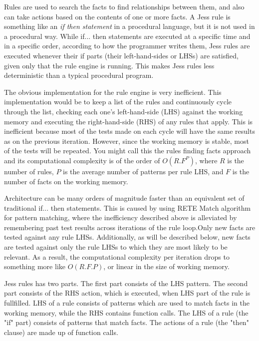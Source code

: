 \documentclass[conference]{IEEEtran}
\begin{document}
Rules are used to search the facts to find relationships
between them, and also can take actions based on the contents of one or more
facts. A Jess rule is something like an \textit{if then statement} in a
procedural language, but it is not used in a procedural way. While if... then statements are executed at a specific time and in a
specific order, according to how the programmer writes them, Jess rules are executed
whenever their if parts (their left-hand-sides or LHSs) are satisfied, given only that the rule
engine is running. This makes Jess rules less deterministic than a typical procedural program.


The obvious implementation for the rule engine is very inefficient. This
implementation would be to keep a list of the rules and continuously cycle
through the list, checking each one's left-hand-side (LHS) against the working
memory and executing the right-hand-side (RHS) of any rules that apply. This is
inefficient because most of the tests made on each cycle will have the same
results as on the previous iteration. However, since the working memory is
stable, most of the tests will be repeated. You might call this the rules
finding facts approach and its computational complexity is of the order of
$O(R.F^P)$, where $R$ is the number of rules, $P$ is the average number of
patterns per rule LHS, and $F$ is the number of facts on the working memory.



Architecture can be many orders of magnitude faster than an equivalent set
of traditional if... then statements. This is caused by using RETE Match
algorithm for pattern matching, where the inefficiency described above is
alleviated by remembering past test results across iterations of the rule
loop.Only new facts are tested against any rule LHSs. Additionally, as will be
described below, new facts are tested against only the rule LHSs to which they
are most likely to be relevant. As a result, the computational complexity per
iteration drops to something more like $O(R.F.P)$, or linear in the size of
working memory.



Jess rules has two parts. The first part consists of the LHS pattern. The second
part consists of the RHS action, which is executed, when LHS part of the rule is fullfilled. LHS of a
rule consists of patterns which are used to match facts in the working memory,
while the RHS contains function calls. The LHS of a rule (the "if" part)
consists of patterns that match facts. The actions of a rule (the "then" clause)
are made up of function calls.
\end{document}
